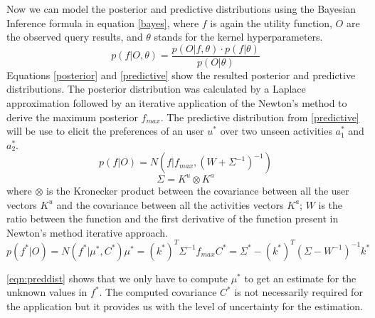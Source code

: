 \documentclass[11pt,a4paper,oneside]{article}
\begin{document}
Now we can model the posterior and predictive distributions using the Bayesian Inference formula in equation \ref{bayes}, where $f$ is again the utility function, $O$ are the observed query results, and $\theta$ stands for the kernel hyperparameters.
\begin{equation}
    \label{bayes}
    p(f|O, \theta) = \frac{p(O|f,\theta) \cdot p(f|\theta)}{p(O|\theta)} 
\end{equation}
Equations \ref{posterior} and \ref{predictive} show the resulted posterior and predictive distributions. The posterior distribution was calculated by a Laplace approximation followed by an iterative application of the Newton's method to derive the maximum posterior $f_{max}$. The predictive distribution from \ref{predictive} will be use to elicit the preferences of an user $u^*$ over two unseen activities $a^*_1$ and $a^*_2$. 
\begin{equation}
    \label{posterior}
    p(f|O) = N(f|f_{max}, (W + \Sigma^{-1})^{-1})
\end{equation}
\begin{equation}
     \Sigma = K^u \otimes K^a
\end{equation}
where $\otimes$ is the Kronecker product between the covariance between all the user vectors $K^u$ and the covariance between all the activities vectors $K^a$; $W$ is the ratio between the function and the first derivative of the function present in Newton's method iterative approach.
\begin{subequations}
\label{eqn:preddist}
\begin{equation}
    \label{predictive}
    p(f^*|O) = N(f^*|\mu^*, C^*)
\end{equation}
\begin{equation}
    \mu^* = (k^*)^T\Sigma^{-1}f_{max}
\end{equation}
\begin{equation}
    C^* = \Sigma^* - (k^*)^T(\Sigma - W^{-1})^{-1}k^*    
\end{equation}
\end{subequations}

\autoref{eqn:preddist} shows that we only have to compute $\mu^*$ to get an estimate for the unknown values in $f^*$. The computed covariance $C^*$ is not necessarily required for the application but it provides us with the level of uncertainty for the estimation.
 
\end{document}
